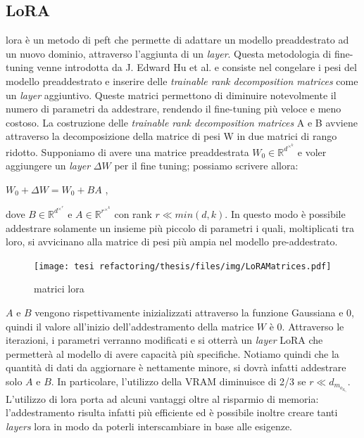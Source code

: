     \subsection{LoRA}
    \gls{lora} è un metodo di \gls{peft}\cite{article:Purnawansyah2024MemoryEW} che permette di adattare un modello preaddestrato ad un nuovo dominio, attraverso l'aggiunta di un \textit{layer}.
    Questa metodologia di \gls{fine-tuning} venne introdotta da J. Edward Hu et al.\cite{article:Hu2021LoRALA} e consiste nel congelare i pesi del modello preaddestrato e inserire delle \textit{trainable rank decomposition matrices} come un \textit{layer} aggiuntivo.
    Queste matrici permettono di diminuire notevolmente il numero di parametri da addestrare, rendendo il \gls{fine-tuning} più veloce e meno costoso.
    La costruzione delle \textit{trainable rank decomposition matrices} A e B avviene attraverso la decomposizione della matrice di pesi W in due matrici di rango ridotto.
    Supponiamo di avere una matrice preaddestrata $W_0 \in \mathbb{R}^d^\times^k$ e voler aggiungere un \textit{layer} $\Delta W$ per il fine tuning; possiamo scrivere allora:\newline 
    \centerline{$ W_0 + \Delta W = W_0 + BA$ ,}
    \newline 
    dove $B \in \mathbb{R}^d^\times^r$ e $A \in \mathbb{R}^r^\times^k$ con rank $r \ll min(d, k)$. 
    In questo modo è possibile addestrare solamente un insieme più piccolo di parametri i quali, moltiplicati tra loro, si avvicinano alla matrice di pesi più ampia nel modello pre-addestrato.
    \begin{figure}[htp]
        \centering
        \texttt{[image: tesi refactoring/thesis/files/img/LoRAMatrices.pdf]}
        \caption{matrici \gls{lora}}
        \label{fig:entanglement}
    \end{figure}
    \newline
    $A$ e $B$ vengono rispettivamente inizializzati attraverso la funzione Gaussiana e 0, quindi il valore all'inizio dell'addestramento della matrice $W$ è 0. Attraverso le iterazioni, i parametri verranno modificati e si otterrà un \textit{layer} LoRA che permetterà al modello di avere capacità più specifiche.
    Notiamo quindi che la quantità di dati da aggiornare è nettamente minore, si dovrà infatti addestrare solo $A$ e $B$. In particolare, l'utilizzo della VRAM diminuisce di 2/3 se  $r \ll d_m_o_d_e_l$.
    L'utilizzo di \gls{lora} porta ad alcuni vantaggi oltre al risparmio di memoria: l'addestramento risulta infatti più efficiente ed è possibile inoltre creare tanti \textit{layers} \gls{lora} in modo da poterli interscambiare in base alle esigenze.
